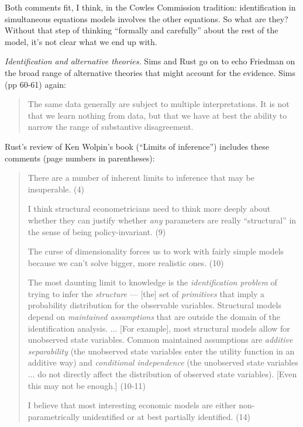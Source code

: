 \documentclass[11pt,letterpaper]{article}
\begin{document}
Both comments fit, I think, in the Cowles Commission tradition:
identification in simultaneous equations models involves the other equations.
So what are they?
Without that step of thinking ``formally and carefully'' about the rest of the model,
it's not clear what we end up with.

{\it Identification and alternative theories.\/}
Sims and Rust go on to echo Friedman on the broad range of alternative theories
that might account for the evidence.
Sims (pp 60-61) again:
\begin{quote}
The same data generally are subject to multiple interpretations.
It is not that we learn nothing from data, but that we have at best the ability to
narrow the range of substantive disagreement.
\end{quote}
%
Rust's review of Ken Wolpin's book (``Limits of inference'')
includes these comments (page numbers in parentheses):
\begin{quote}
There are a number of inherent limits to inference that may be insuperable.  (4)

I think structural econometricians need to think more deeply about whether
they can justify whether {\it any\/} parameters are really ``structural''
in the sense of being policy-invariant. (9)

The curse of dimensionality forces us to work with fairly simple models
because we can't solve bigger, more realistic ones.  (10)

The most daunting limit to knowledge is the {\it identification problem\/}
of trying to infer the {\it structure\/} --- [the] set of
{\it primitives\/} that imply a probability distribution for
the observable variables.
Structural models depend on {\it maintained assumptions\/} that are outside the domain
of the identification analysis. ...
[For example], most structural  models allow for unobserved state variables.
Common maintained assumptions are {\it additive separability\/}
(the unobserved state variables enter the utility function in an additive way)
and {\it conditional independence\/}
(the unobserved state variables ... do not directly affect
the distribution of observed state variables).
[Even this may not be enough.]
(10-11)

I believe that most interesting economic models are either non-parametrically
unidentified or at best partially identified.
(14)
\end{quote}
\end{document}
